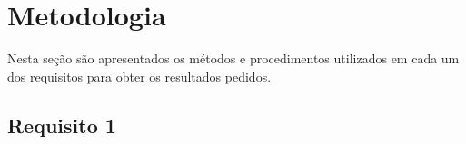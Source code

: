 \documentclass{bmvc2k}
\begin{document}
\section{Metodologia}
\label{sec:Methods}
Nesta seção são apresentados os métodos e procedimentos utilizados em cada um dos requisitos para obter os resultados pedidos.
\subsection{Requisito 1}



\end{document}
